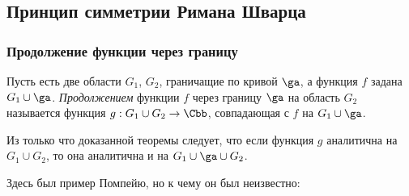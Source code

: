\documentclass[a4paper]{article}
\begin{document}
\subsection{Принцип симметрии Римана Шварца}

\subsubsection{Продолжение функции через границу}

\begin{df}
Пусть есть две области $G_1$, $G_2$, граничащие по кривой $\ga$, а функция $f$ задана $G_1\cup\ga$.
\emph{Продолжением} функции $f$ через границу $\ga$ на область $G_2$ называется функция $g:G_1\cup G_2\to\Cbb$,
совпадающая с $f$ на $G_1\cup\ga$.
\end{df}

Из только что доказанной теоремы следует, что если функция $g$ аналитична на $G_1 \cup G_2$,
то она аналитична  и на $G_1\cup \ga\cup G_2$.

\begin{petit}
Здесь был пример Помпейю, но к чему он был  неизвестно:
\end{petit}
\end{document}
